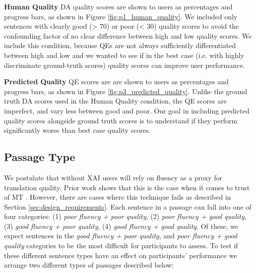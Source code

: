 \begin{compacthang}
    \item \textbf{Human Quality} DA quality scores are shown to users as percentages and progress bars, as shown in Figure \ref{fig:p1_human_quality}. We included only sentences with clearly good (> 70) or poor (< 30) quality scores to avoid the confounding factor of no clear difference between high and low quality scores. We include this condition, because QEs are not always sufficiently differentiated between high and low and we wanted to see if in the best case (i.e. with highly discriminate ground-truth scores) quality scores can improve user performance.  

    \item \textbf{Predicted Quality} QE scores are are shown to users as percentages and progress bars, as shown in Figure \ref{fig:p3_predicted_quality}.
    Unlike the ground truth DA scores used in the Human Quality condition, the QE scores are imperfect, and vary less between good and poor. Our goal in including predicted quality scores alongside ground truth scores is to understand if they perform significantly worse than best case quality scores. 
    
\end{compacthang}

\subsection{Passage Type}
We postulate that without XAI users will rely on fluency as a proxy for translation quality. Prior work shows that this is the case when it comes to trust of MT \cite{martindaleFluency2018}. However, there are cases where this technique fails as described in Section \ref{sec:design_requirements}.  
Each sentence in a passage can fall into one of four categories: (1) \textit{poor fluency + poor quality}, (2) \textit{poor fluency + good quality}, (3) \textit{good fluency + poor quality}, (4) \textit{good fluency + good quality}. Of these, we expect  sentences in the \textit{good fluency + poor quality}, and \textit{poor fluency + good quality} categories to be the most difficult for participants to assess. To test if these different sentence types have an effect on participants’ performance we arrange two different types of passages described below: 

